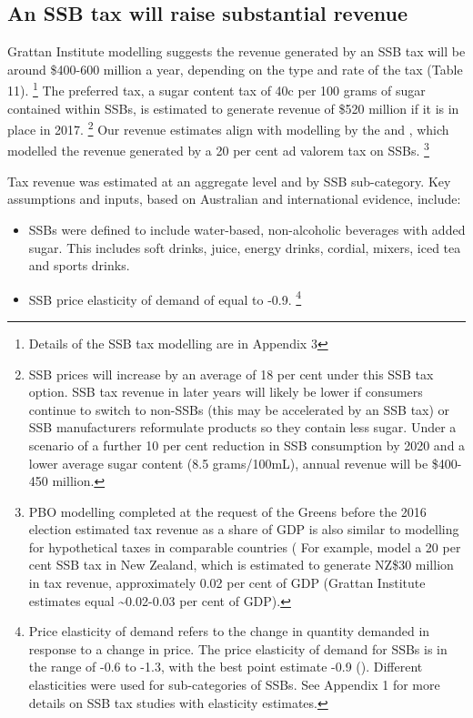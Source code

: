 \documentclass[embargoed]{grattan}
\begin{document}
\subsection{An SSB tax will raise substantial revenue}\label{an-ssb-tax-will-raise-substantial-revenue}


Grattan Institute modelling suggests the revenue generated by an SSB tax will be around \$400-600 million a year, depending on the type and rate of the tax (Table 11).%
\footnote{Details of the SSB tax modelling are in Appendix 3} The preferred tax, a sugar content tax of 40c per 100 grams of sugar contained within SSBs, is estimated to generate revenue of \$520 million if it is in place in 2017.%
\footnote{SSB prices will increase by an average of 18 per cent under this SSB tax option.
SSB tax revenue in later years will likely be lower if consumers continue to switch to non-SSBs (this may be accelerated by an SSB tax) or SSB manufacturers reformulate products so they contain less sugar.
Under a scenario of a further 10 per cent reduction in SSB consumption by 2020 and a lower average sugar content (8.5 grams/100mL), annual revenue will be \$400-450 million.} Our revenue estimates align with modelling by the \textcite{Office2016PolicycostingAustralian} and \textcite{Veerman2016ImpactTaxSugar}, which modelled the revenue generated by a 20 per cent ad valorem tax on SSBs. \footnote{PBO modelling completed at the request of the Greens before the 2016 election estimated tax revenue as a share of GDP is also similar to modelling for hypothetical taxes in comparable countries (\textcites{Andreyeva2011Estimatingpotentialtaxes}{Briggs2013Overallincomespecific} For example, \textcite{Mhurchu2007Nutritionlabelsclaims} model a 20 per cent SSB tax in New Zealand, which is estimated to generate NZ\$30 million in tax revenue, approximately 0.02 per cent of GDP (Grattan Institute estimates equal \textasciitilde{}0.02-0.03 per cent of GDP).}

Tax revenue was estimated at an aggregate level and by SSB sub-category.
Key assumptions and inputs, based on Australian and international evidence, include:

\begin{itemize}
\item
  SSBs were defined to include water-based, non-alcoholic beverages with added sugar.
This includes soft drinks, juice, energy drinks, cordial, mixers, iced tea and sports drinks.
\item
  SSB price elasticity of demand of equal to -0.9.%
\footnote{Price elasticity of demand refers to the change in quantity demanded in response to a change in price.
The price elasticity of demand for SSBs is in the range of -0.6 to -1.3, with the best point estimate -0.9 (\textcites{Andreyeva2010impactfoodprices}{Block2010Pointpurchaseprice}{Sharma2014effectstaxingsugarsweetened}{Yang2016child}{Lineffectssugarsweetened}{Powell2013Assessingpotentialeffectiveness}{Bahl2003uneasycasediscriminatory}{Miao2013Accountingproductsubstitution}{Escobar2013Evidencethattax}).
Different elasticities were used for sub-categories of SSBs.
See Appendix 1 for more details on SSB tax studies with elasticity estimates.}
\end{itemize}
\end{document}
